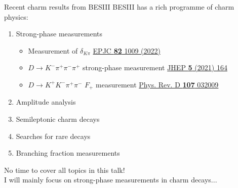 \documentclass{beamer}
\begin{document}
\begin{frame}{Recent charm results from BESIII}
  \vspace{0.0cm}
  {\large BESIII has a rich programme of charm physics:}
  \begin{enumerate}
    \item{Strong-phase measurements}
    \begin{itemize}
      \item{Measurement of $\delta_{K\pi}$ \href{https://link.springer.com/article/10.1140/epjc/s10052-022-10872-2}{EPJC \textbf{82} 1009 (2022)}}
      \item{$D\to K^-\pi^+\pi^-\pi^+$ strong-phase measurement \href{https://link.springer.com/article/10.1007/JHEP05(2021)164}{JHEP \textbf{5} (2021) 164}}
      \item{$D\to K^+K^-\pi^+\pi^-$ $F_+$ measurement \href{https://journals.aps.org/prd/abstract/10.1103/PhysRevD.107.032009}{Phys. Rev. D \textbf{107} 032009}}
    \end{itemize}
    \item{Amplitude analysis}
    \item{Semileptonic charm decays}
    \item{Searches for rare decays}
    \item{Branching fraction measurements}
  \end{enumerate}
  \begin{center}
    {\Large No time to cover all topics in this talk!\\
      I will mainly focus on strong-phase measurements in charm decays...}
  \end{center}
\end{frame}
\end{document}
